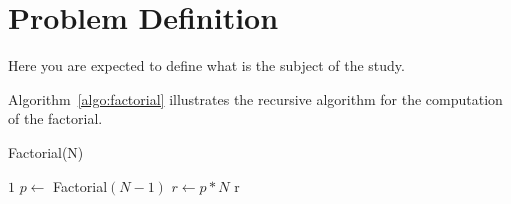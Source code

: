 \section{Problem Definition}
Here you are expected to define what is the subject of the study.

Algorithm~\ref{algo:factorial} illustrates the recursive algorithm for
the computation of the factorial.

\begin{algorithm}[H]	%
	\caption{Factorial(N)}	%
	\begin{algorithmic}
			\RETURN $1$	
		\ELSE
		\STATE $p \gets$ Factorial$(N - 1)$
		\STATE $r \gets p * N$
		\ENDIF
		\RETURN r
	\end{algorithmic}
	\label{algo:factorial}	%
\end{algorithm}
